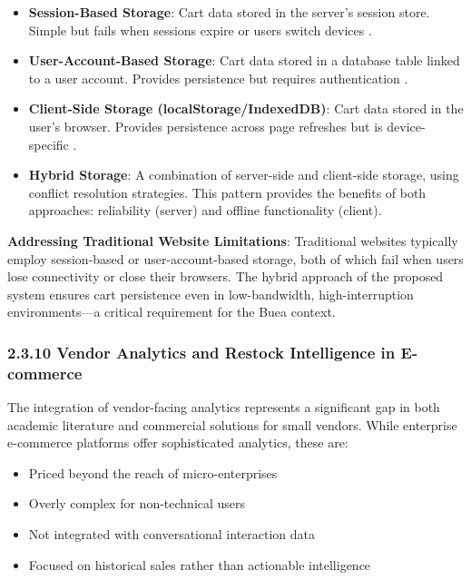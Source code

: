 \documentclass[12pt,a4paper]{article}
\begin{document}
\begin{itemize}
    \item \textbf{Session-Based Storage}: Cart data stored in the server's session store. Simple but fails when sessions expire or users switch devices \citep{hamedani2026}.
    \item \textbf{User-Account-Based Storage}: Cart data stored in a database table linked to a user account. Provides persistence but requires authentication \citep{chintalapudi2025}.
    \item \textbf{Client-Side Storage (localStorage/IndexedDB)}: Cart data stored in the user's browser. Provides persistence across page refreshes but is device-specific \citep{liu2026}.
    \item \textbf{Hybrid Storage}: A combination of server-side and client-side storage, using conflict resolution strategies. This pattern provides the benefits of both approaches: reliability (server) and offline functionality (client).
\end{itemize}

\textbf{Addressing Traditional Website Limitations}: Traditional websites typically employ session-based or user-account-based storage, both of which fail when users lose connectivity or close their browsers. The hybrid approach of the proposed system ensures cart persistence even in low-bandwidth, high-interruption environments---a critical requirement for the Buea context.

\subsubsection{2.3.10 Vendor Analytics and Restock Intelligence in E-commerce}

The integration of vendor-facing analytics represents a significant gap in both academic literature and commercial solutions for small vendors. While enterprise e-commerce platforms offer sophisticated analytics, these are:

\begin{itemize}
    \item Priced beyond the reach of micro-enterprises
    \item Overly complex for non-technical users
    \item Not integrated with conversational interaction data
    \item Focused on historical sales rather than actionable intelligence
\end{itemize}
\end{document}
